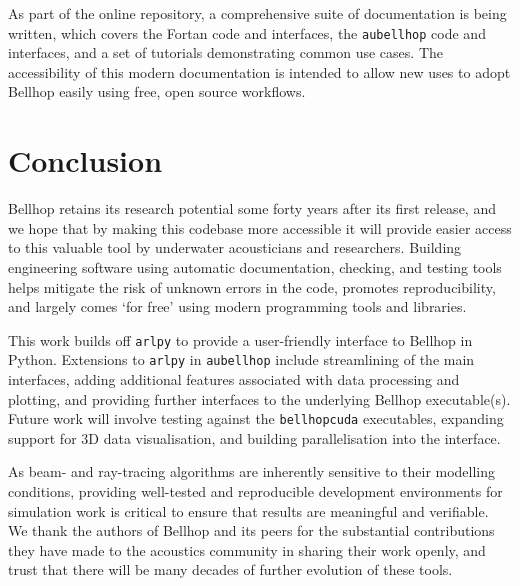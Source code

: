 \documentclass{internoise2026-wr}
\begin{document}
As part of the online repository, a comprehensive suite of documentation is being written, which covers the Fortan code and interfaces, the \texttt{aubellhop} code and interfaces, and a set of tutorials demonstrating common use cases.
The accessibility of this modern documentation is intended to allow new uses to adopt Bellhop easily using free, open source workflows.



\section{Conclusion}
\label{sec:conclusion}

Bellhop retains its research potential some forty years after its first release, and we hope that by making this codebase more accessible it will provide easier access to this valuable tool by underwater acousticians and researchers.
Building engineering software using automatic documentation, checking, and testing tools helps mitigate the risk of unknown errors in the code, promotes reproducibility, and largely comes `for free' using modern programming tools and libraries.

This work builds off \texttt{arlpy} to provide a user-friendly interface to Bellhop in Python. Extensions to \texttt{arlpy} in \texttt{aubellhop} include streamlining of the main interfaces, adding additional features associated with data processing and plotting, and providing further interfaces to the underlying Bellhop executable(s).
Future work will involve testing against the \texttt{bellhopcuda} executables, expanding support for 3D data visualisation, and building parallelisation into the interface.

As beam- and ray-tracing algorithms are inherently sensitive to their modelling conditions, providing well-tested and reproducible development environments for simulation work is critical to ensure that results are meaningful and verifiable.
We thank the authors of Bellhop and its peers for the substantial contributions they have made to the acoustics community in sharing their work openly, and trust that there will be many decades of further evolution of these tools.

\printbibliography
\end{document}
